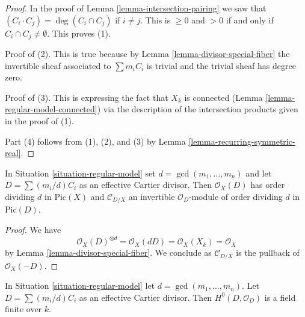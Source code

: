 \begin{proof}
In the proof of Lemma \ref{lemma-intersection-pairing} we saw that
$(C_i \cdot C_j) = \deg(C_i \cap C_j)$ if $i \not = j$. This is
$\geq 0$ and $> 0 $ if and only if $C_i \cap C_j \not = \emptyset$.
This proves (1).

\medskip\noindent
Proof of (2). This is true because by Lemma \ref{lemma-divisor-special-fiber}
the invertible sheaf associated to $\sum m_i C_i$
is trivial and the trivial sheaf has degree zero.

\medskip\noindent
Proof of (3). This is expressing the fact that $X_k$ is connected
(Lemma \ref{lemma-regular-model-connected})
via the description of the intersection products given in the proof of (1).

\medskip\noindent
Part (4) follows from (1), (2), and (3) by
Lemma \ref{lemma-recurring-symmetric-real}.
\end{proof}

\begin{lemma}
\label{lemma-multiple-fibre-normal-bundle}
In Situation \ref{situation-regular-model} set $d = \gcd(m_1, \ldots, m_n)$
and let $D = \sum (m_i/d)C_i$ as an effective Cartier divisor.
Then $\mathcal{O}_X(D)$ has order dividing $d$ in $\text{Pic}(X)$
and $\mathcal{C}_{D/X}$ an invertible $\mathcal{O}_D$-module
of order dividing $d$ in $\text{Pic}(D)$.
\end{lemma}

\begin{proof}
We have
$$
\mathcal{O}_X(D)^{\otimes d} = \mathcal{O}_X(dD) =
\mathcal{O}_X(X_k) = \mathcal{O}_X
$$
by Lemma \ref{lemma-divisor-special-fiber}.
We conclude as $\mathcal{C}_{D/X}$ is the pullback of
$\mathcal{O}_X(-D)$.
\end{proof}

\begin{lemma}
\label{lemma-regular-model-field}
\begin{reference}
\cite[Lemma 2.6]{Artin-Winters}
\end{reference}
In Situation \ref{situation-regular-model} let $d = \gcd(m_1, \ldots, m_n)$.
Let $D = \sum (m_i/d) C_i$ as an effective Cartier divisor. Then
$H^0(D, \mathcal{O}_D)$ is a field finite over $k$.
\end{lemma}

